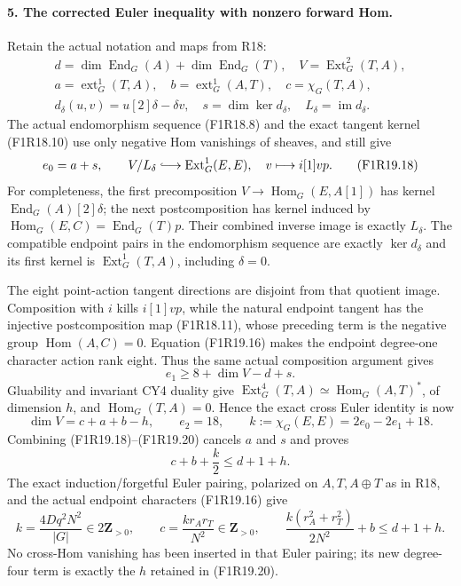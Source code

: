 \paragraph{5. The corrected Euler inequality with nonzero forward Hom.}
Retain the actual notation and maps from R18:
\[
 \begin{gathered}
 d=\dim\operatorname{End}_G(A)+\dim\operatorname{End}_G(T),\quad
 V=\operatorname{Ext}^2_G(T,A),\\
 a=\operatorname{ext}^1_G(T,A),\quad
 b=\operatorname{ext}^1_G(A,T),\quad c=\chi_G(T,A),\\
 d_\delta(u,v)=u[2]\delta-\delta v,\quad
 s=\dim\ker d_\delta,\quad L_\delta=\operatorname{im}d_\delta.
 \end{gathered}
 \tag{F1R19.17}
\]
The actual endomorphism sequence (F1R18.8) and the
exact tangent kernel (F1R18.10) use only negative Hom
vanishings of sheaves, and still give
\[
                  e_0=a+s,\qquad
       V/L_\delta\lhook\joinrel\longrightarrow
          \operatorname{Ext}^1_G(E,E),\quad
                         v\longmapsto i[1]vp.
 \tag{F1R19.18}
\]
For completeness, the first precomposition
$V\to\operatorname{Hom}_G(E,A[1])$ has kernel
$\operatorname{End}_G(A)[2]\delta$; the next
postcomposition has kernel induced by
$\operatorname{Hom}_G(E,C)=\operatorname{End}_G(T)p$.
Their combined inverse image is exactly $L_\delta$.
The compatible endpoint pairs in the endomorphism
sequence are exactly $\ker d_\delta$ and its first
kernel is $\operatorname{Ext}^1_G(T,A)$, including
$\delta=0$.

The eight point-action tangent directions are disjoint
from that quotient image. Composition with $i$ kills
$i[1]vp$, while the natural endpoint tangent has the
injective postcomposition map (F1R18.11), whose
preceding term is the negative group
$\operatorname{Hom}(A,C)=0$. Equation (F1R19.16)
makes the endpoint degree-one character action rank
eight. Thus the same actual composition argument gives
\[
                         e_1\ge8+\dim V-d+s.
 \tag{F1R19.19}
\]
Gluability and invariant CY4 duality give
$\operatorname{Ext}^4_G(T,A)\simeq
 \operatorname{Hom}_G(A,T)^*$, of dimension $h$,
and $\operatorname{Hom}_G(T,A)=0$. Hence the exact
cross Euler identity is now
\[
               \dim V=c+a+b-h,\qquad
               e_2=18,\qquad k:=\chi_G(E,E)=2e_0-2e_1+18.
 \tag{F1R19.20}
\]
Combining (F1R19.18)--(F1R19.20) cancels $a$ and $s$
and proves
\[
                         c+b+\frac{k}{2}\le d+1+h.
 \tag{F1R19.21}
\]
The exact induction/forgetful Euler pairing, polarized
on $A,T,A\oplus T$ as in R18, and the actual endpoint
characters (F1R19.16) give
\[
 k=\frac{4Dq^2N^2}{|G|}\in2\mathbf Z_{>0},\qquad
 c=\frac{k r_A r_T}{N^2}\in\mathbf Z_{>0},\qquad
              \frac{k(r_A^2+r_T^2)}{2N^2}+b\le d+1+h.
 \tag{F1R19.22}
\]
No cross-Hom vanishing has been inserted in that Euler
pairing; its new degree-four term is exactly the
$h$ retained in (F1R19.20).

